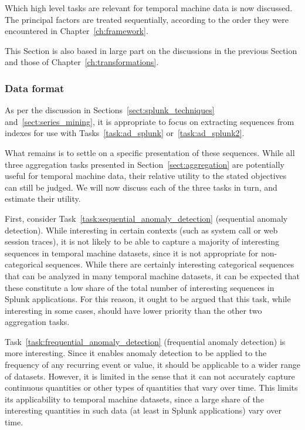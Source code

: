 Which high level tasks are relevant for temporal machine data is now discussed. The principal factors are treated sequentially, according to the order they were encountered in Chapter~\ref{ch:framework}.

This Section is also based in large part on the discussions in the previous Section and those of Chapter~\ref{ch:transformations}. 

\subsubsection{Data format}
\label{sect:relevant_data_format}

As per the discussion in Sections~\ref{sect:splunk_techniques} and~\ref{sect:series_mining}, it is appropriate to focus on extracting sequences from indexes for use with Tasks~\ref{task:ad_splunk} or~\ref{task:ad_splunk2}.

What remains is to settle on a specific presentation of these sequences. While all three aggregation tasks presented in Section~\ref{sect:aggregation} are potentially useful for temporal machine data, their relative utility to the stated objectives can still be judged. We will now discuss each of the three tasks in turn, and estimate their utility.

First, consider Task~\ref{task:sequential_anomaly_detection} (sequential anomaly detection). While interesting in certain contexts (such as system call or web session traces), it is not likely to be able to capture a majority of interesting sequences in temporal machine datasets, since it is not appropriate for non-categorical sequences. While there are certainly interesting categorical sequences that can be analyzed in many temporal machine datasets, it can be expected that these constitute a low share of the total number of interesting sequences in Splunk applications. For this reason, it ought to be argued that this task, while interesting in some cases, should have lower priority than the other two aggregation tasks.

Task~\ref{task:frequential_anomaly_detection} (frequential anomaly detection) is more interesting. Since it enables anomaly detection to be applied to the frequency of any recurring event or value, it should be applicable to a wider range of datasets. However, it is limited in the sense that it can not accurately capture continuous quantities or other types of quantities that vary over time. This limits its applicability to temporal machine datasets, since a large share of the interesting quantities in such data (at least in Splunk applications) vary over time.


